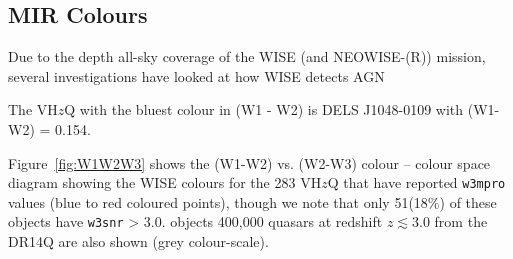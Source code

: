 \documentclass[usenatbib]{mnras}
\begin{document}
\subsection{MIR Colours}
Due to the depth all-sky coverage of the WISE (and NEOWISE-(R)) mission, 
several investigations have looked at how WISE detects AGN 
\citet[e.g][]{Stern2012, Assef2012, Secrest2015, LaMassa2017, Assef2018, Glikman2018, LaMassa2019} 

The VH$z$Q with the bluest colour in (W1 - W2) is 
DELS J1048-0109 with (W1-W2) = 0.154. 

Figure~\ref{fig:W1W2W3} shows the (W1-W2) vs. (W2-W3) colour – colour space diagram showing the WISE colours for the 283 VH$z$Q that have reported {\tt w3mpro} values (blue to red coloured points), though we note that only 51(18\%) of these objects have {\tt w3snr} > 3.0.  objects  400,000 quasars
at redshift $z\lesssim3.0$ from the DR14Q are also shown (grey
colour-scale). 
\end{document}
